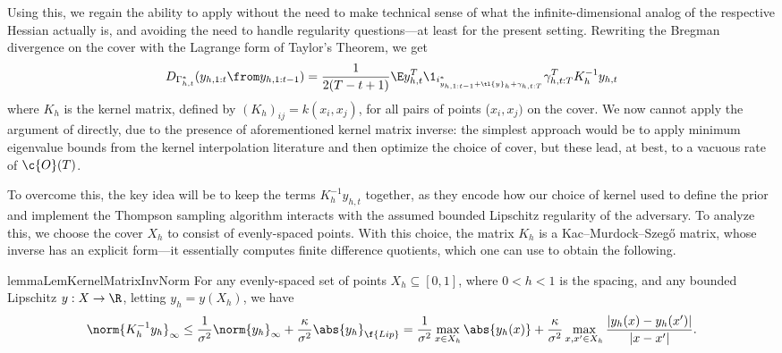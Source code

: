 \documentclass[preprint,12pt]{colt2025}
\begin{document}
Using this, we regain the ability to apply  without the need to make technical sense of what the infinite-dimensional analog of the respective Hessian actually is, and avoiding the need to handle regularity questions---at least for the present setting.
Rewriting the Bregman divergence on the cover with the Lagrange form of Taylor's Theorem, we get
\[
D_{\Gamma_{h,t}^*}(y_{h,1:t} \from y_{h,1:t-1}) = \frac{1}{2(T-t+1)}\E y_{h,t}^T \1_{i^*_{y_{h,1:t-1} + \tl{y}_h + \gamma_{h,t:T}}} \gamma_{h,t:T}^T K_h^{-1} y_{h,t} 
\]
where $K_h$ is the kernel matrix, defined by $(K_h)_{ij} = k(x_i, x_j)$, for all pairs of points ($x_i, x_j)$ on the cover.
We now cannot apply the argument of \textcite{abernethy2016perturbation} directly, due to the presence of aforementioned kernel matrix inverse: the simplest approach would be to apply minimum eigenvalue bounds from the kernel interpolation literature \cite{wendland04,schaback11} and then optimize the choice of cover, but these lead, at best, to a vacuous rate of $\c{O}(T)$.

To overcome this, the key idea will be to keep the terms $K^{-1}_h y_{h,t}$ together, as they encode how our choice of kernel used to define the prior and implement the Thompson sampling algorithm interacts with the assumed bounded Lipschitz regularity of the adversary.
To analyze this, we choose the cover $X_h$ to consist of evenly-spaced points.
With this choice, the matrix $K_h$ is a Kac--Murdock--Szegő matrix, whose inverse has an explicit form---it essentially computes finite difference quotients, which one can use to obtain the following.

\begin{restatable}{lemma}{LemKernelMatrixInvNorm}
\label{lem:kernel_matrix_inv_norm}
For any evenly-spaced set of points $X_h \subseteq [0,1]$, where $0<h<1$ is the spacing, and any bounded Lipschitz $y: X\to \R$, letting $y_h = y(X_h)$, we have
\[
\norm{K^{-1}_h y_h}_\infty \leq \frac{1}{\sigma^2} \norm{y_h}_\infty + \frac{\kappa}{\sigma^2} \abs{y_h}_{\f{Lip}} = \frac{1}{\sigma^2}\max_{x\in X_h} \abs{y_h(x)} + \frac{\kappa }{\sigma^2}\max_{x,x' \in X_h} \frac{|y_h(x) - y_h(x')|}{|x-x'|}
.
\]
\end{restatable}
\end{document}
